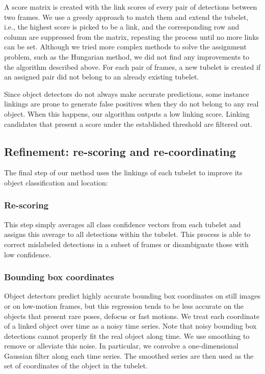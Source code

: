 \documentclass[letterpaper, 10 pt, conference]{ieeeconf}
\begin{document}
A score matrix is created with the link scores of every pair of detections between two frames. We use a greedy approach to match them and extend the tubelet, i.e., the highest score is picked to be a link, and the corresponding row and column are suppressed from the matrix, repeating the process until no more links can be set. 
Although we tried more complex methods to solve the assignment problem, such as the Hungarian method, 
we did not find any improvements to the algorithm described above.
For each pair of frames, a new tubelet is created if an assigned pair did not belong to an already existing tubelet. 

















Since object detectors do not always make accurate predictions, some instance linkings are prone to generate false positives when they do not belong to any real object. When this happens, our algorithm outputs a low linking score. Linking candidates that present a score under the established threshold are filtered out.




\subsection{Refinement: re-scoring and re-coordinating}

The final step of our method uses the linkings of each tubelet to improve its object classification and location:

\subsubsection{Re-scoring}
This step simply averages all class confidence vectors from each tubelet and assigns this average to all detections within the tubelet. This process is able to correct mislabeled detections in a subset of frames or disambiguate those with low confidence.


\subsubsection{Bounding box coordinates}
Object detectors predict highly accurate bounding box coordinates on still images or on low-motion frames, but this regression tends to be less accurate on the objects that present rare poses, defocus or fast motions. 
We treat each coordinate of a linked object over time as a noisy time series. 
Note that noisy bounding box detections cannot properly fit the real object along time.
We use smoothing to remove or alleviate this noise. In particular, we convolve a one-dimensional Gaussian filter along each time series. The smoothed series are then used as the set of coordinates of the object in the tubelet.
\end{document}
